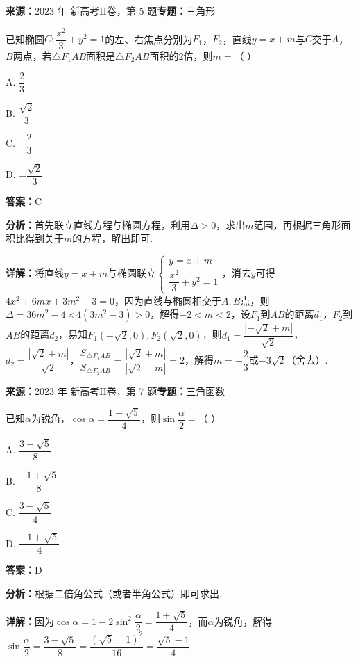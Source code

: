 \begin{question}[points=5]
\textbf{来源：}2023 年 新高考II卷，第 5 题\quad \textbf{专题：}三角形\par
已知椭圆$C:\dfrac{x^{2}}{3}+y^{2}=1$的左、右焦点分别为$F_{1}$，$F_{2}$，直线$y=x+m$与$C$交于$A$，$B$两点，若$\triangle F_{1}AB$面积是$\triangle F_{2}AB$面积的2倍，则$m=$（ \quad ）
\begin{choices}
  \item A. $\dfrac{2}{3}$
  \item B. $\dfrac{\sqrt{2}}{3}$
  \item C. $-\dfrac{2}{3}$
  \item D. $-\dfrac{\sqrt{2}}{3}$
\end{choices}
\begin{solution}
\textbf{答案：}C

\textbf{分析：}首先联立直线方程与椭圆方程，利用$\Delta>0$，求出$m$范围，再根据三角形面积比得到关于$m$的方程，解出即可.

\textbf{详解：}将直线$y=x+m$与椭圆联立$\begin{cases}y=x+m\\ \dfrac{x^{2}}{3}+y^{2}=1\end{cases}$，消去$y$可得$4x^{2}+6mx+3m^{2}-3=0$，因为直线与椭圆相交于$A,B$点，则$\Delta=36m^{2}-4\times4(3m^{2}-3)>0$，解得$-2<m<2$，设$F_{1}$到$AB$的距离$d_{1}$，$F_{2}$到$AB$的距离$d_{2}$，易知$F_{1}(-\sqrt{2},0),F_{2}(\sqrt{2},0)$，则$d_{1}=\dfrac{|-\sqrt{2}+m|}{\sqrt{2}}$，$d_{2}=\dfrac{|\sqrt{2}+m|}{\sqrt{2}}$，$\dfrac{S_{\triangle F_{1}AB}}{S_{\triangle F_{2}AB}}=\dfrac{|\sqrt{2}+m|}{|\sqrt{2}-m|}=2$，解得$m=-\dfrac{2}{3}$或$-3\sqrt{2}$（舍去）.
\end{solution}
\end{question}

\begin{question}[points=5]
\textbf{来源：}2023 年 新高考II卷，第 7 题\quad \textbf{专题：}三角函数\par
已知$\alpha$为锐角，$\cos\alpha=\dfrac{1+\sqrt{5}}{4}$，则$\sin\dfrac{\alpha}{2}=$（ \quad ）
\begin{choices}
  \item A. $\dfrac{3-\sqrt{5}}{8}$
  \item B. $\dfrac{-1+\sqrt{5}}{8}$
  \item C. $\dfrac{3-\sqrt{5}}{4}$
  \item D. $\dfrac{-1+\sqrt{5}}{4}$
\end{choices}
\begin{solution}
\textbf{答案：}D

\textbf{分析：}根据二倍角公式（或者半角公式）即可求出.

\textbf{详解：}因为$\cos\alpha=1-2\sin^{2}\dfrac{\alpha}{2}=\dfrac{1+\sqrt{5}}{4}$，而$\alpha$为锐角，解得$\sin\dfrac{\alpha}{2}=\dfrac{3-\sqrt{5}}{8}=\dfrac{(\sqrt{5}-1)^{2}}{16}=\dfrac{\sqrt{5}-1}{4}$.
\end{solution}
\end{question}


